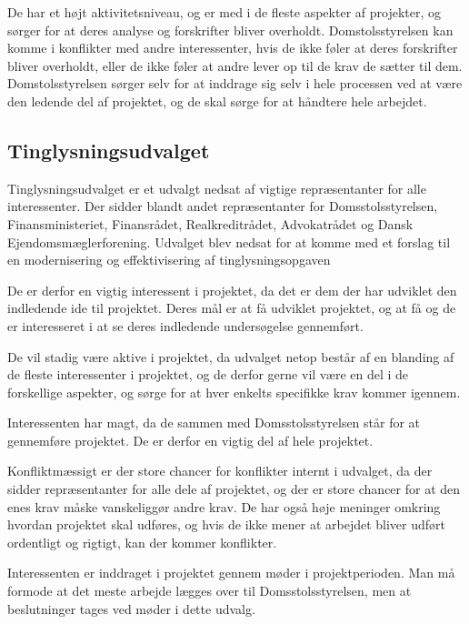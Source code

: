 \documentclass[10pt,a4paper,danish]{article}
\begin{document}
De har et højt aktivitetsniveau, og er med i de fleste aspekter af projekter, og sørger for at deres analyse og forskrifter bliver overholdt. Domstolsstyrelsen kan komme i konflikter med andre interessenter, hvis de ikke føler at deres forskrifter bliver overholdt, eller de ikke føler at andre lever op til de krav de sætter til dem. Domstolsstyrelsen sørger selv for at inddrage sig selv i hele processen ved at være den ledende del af projektet, og de skal sørge for at håndtere hele arbejdet.


\subsection{Tinglysningsudvalget}

Tinglysningsudvalget er et udvalgt nedsat af vigtige repræsentanter for alle interessenter. Der sidder blandt andet repræsentanter for Domsstolsstyrelsen, Finansministeriet, Finansrådet, Realkreditrådet, Advokatrådet og Dansk Ejendomsmæglerforening. Udvalget blev nedsat for at komme med et forslag til en modernisering og effektivisering af tinglysningsopgaven

De er derfor en vigtig interessent i projektet, da det er dem der har udviklet den indledende ide til projektet. Deres mål er at få udviklet projektet, og at få og de er interesseret i at se deres indledende undersøgelse gennemført.

De vil stadig være aktive i projektet, da udvalget netop består af en blanding af de fleste interessenter i projektet, og de derfor gerne vil være en del i de forskellige aspekter, og sørge for at hver enkelts specifikke krav kommer igennem.

Interessenten har magt, da de sammen med Domsstolsstyrelsen står for at gennemføre projektet. De er derfor en vigtig del af hele projektet.

Konfliktmæssigt er der store chancer for konflikter internt i udvalget, da der sidder repræsentanter for alle dele af projektet, og der er store chancer for at den enes krav måske vanskeliggør andre krav. De har også høje meninger omkring hvordan projektet skal udføres, og hvis de ikke mener at arbejdet bliver udført ordentligt og rigtigt, kan der kommer konflikter.

Interessenten er inddraget i projektet gennem møder i projektperioden. Man må formode at det meste arbejde lægges over til Domsstolsstyrelsen, men at beslutninger tages ved møder i dette udvalg.
\end{document}
